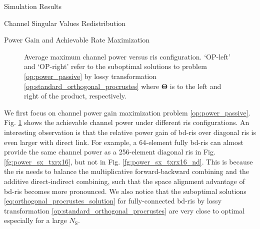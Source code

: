 \documentclass[journal]{IEEEtran}
\begin{document}
\begin{section}{Simulation Results}
\begin{subsection}{Channel Singular Values Redistribution}
	\end{subsection}

	\begin{subsection}{Power Gain and Achievable Rate Maximization}
		\begin{figure}[!t]
			\centering
			\caption{
				Average maximum channel power versus \gls{ris} configuration.
				`OP-left' and `OP-right' refer to the suboptimal solutions to problem \eqref{op:power_passive} by lossy transformation \eqref{op:standard_orthogonal_procrustes} where $\mathbf{\Theta}$ is to the left and right of the product, respectively.
			}
			\label{fg:power_sx}
		\end{figure}

		We first focus on channel power gain maximization problem \eqref{op:power_passive}.
		Fig. \ref{fg:power_sx} shows the achievable channel power under different \gls{ris} configurations.
		An interesting observation is that the relative power gain of \gls{bd}-\gls{ris} over diagonal \gls{ris} is even larger with direct link.
		For example, a 64-element fully \gls{bd}-\gls{ris} can almost provide the same channel power as a 256-element diagonal \gls{ris} in Fig. \ref{fg:power_sx_txrx16}, but not in Fig. \ref{fg:power_sx_txrx16_nd}.
		This is because the \gls{ris} needs to balance the multiplicative forward-backward combining and the additive direct-indirect combining, such that the space alignment advantage of \gls{bd}-\gls{ris} becomes more pronounced.
		We also notice that the suboptimal solutions \eqref{eq:orthogonal_procrustes_solution} for fully-connected \gls{bd}-\gls{ris} by lossy transformation \eqref{op:standard_orthogonal_procrustes} are very close to optimal especially for a large $N_\mathrm{S}$.


\end{subsection}
\end{section}
\end{document}
